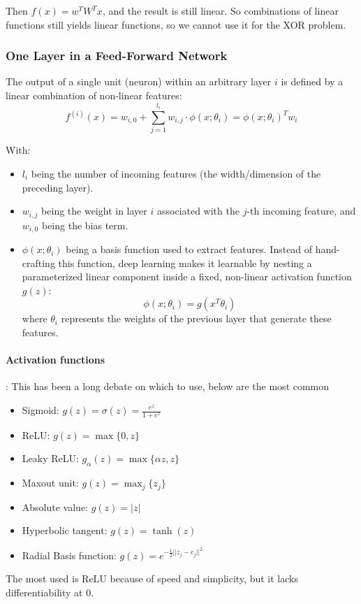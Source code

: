 \documentclass{article}
\begin{document}
Then $f(x) = w^TW^T x$, and the result is still linear. So combinations of linear functions still yields linear functions, so we cannot use it for the XOR problem.
\subsubsection{One Layer in a Feed-Forward Network}
The output of a single unit (neuron) within an arbitrary layer $i$ is defined by a linear combination of non-linear features:
\[f^{(i)}(x) = w_{i,0} + \sum_{j=1}^{l_i} w_{i,j} \cdot \phi(x; \theta_i) = \phi(x;\theta_i)^T w_i\]

With:
\begin{itemize}
  \item $l_i$ being the number of incoming features (the width/dimension of the preceding layer).
  \item $w_{i,j}$ being the weight in layer $i$ associated with the $j$-th incoming feature, and $w_{i,0}$ being the bias term.
  \item $\phi(x;\theta_i)$ being a basis function used to extract features. Instead of hand-crafting this function, deep learning makes it learnable by nesting a parameterized linear component inside a fixed, non-linear activation function $g(z)$:
  \[\phi(x;\theta_i) = g(x^T\theta_i)\]
  where $\theta_i$ represents the weights of the previous layer that generate these features.
\end{itemize}
\paragraph{Activation functions}: This has been a long debate on which to use, below are the most common
\begin{itemize}
  \item Sigmoid: $g(z) = \sigma(z) = \frac{e^z}{1 + e^z}$
  \item ReLU: $g(z) = \max\{0,z\}$
  \item Leaky ReLU: $g_\alpha(z) = \max\{\alpha z, z\}$
  \item Maxout unit: $g(z) = \max_j\{z_j\}$
  \item Absolute value: $g(z) = |z|$
  \item Hyperbolic tangent: $g(z) = \tanh(z)$
  \item Radial Basis function: $g(z) = e^{-\frac{1}{2}||z_j - c_j||^2}$
\end{itemize}
The most used is ReLU because of speed and simplicity, but it lacks differentiability at 0.
\end{document}
